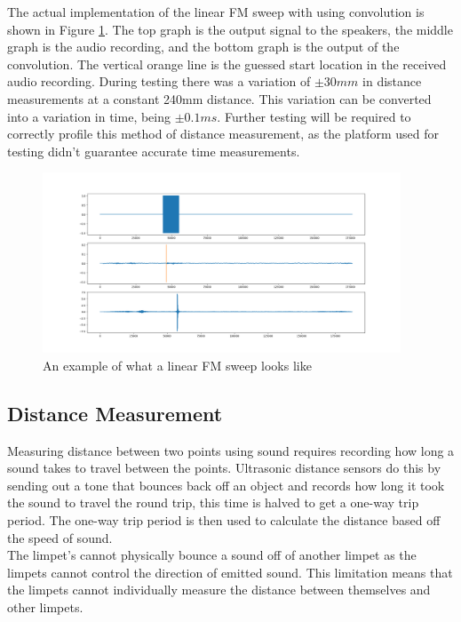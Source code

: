 The actual implementation of the linear FM sweep with using convolution is shown in Figure \ref{fig:matched_filter}. The top graph is the output signal to the speakers, the middle graph is the audio recording, and the bottom graph is the output of the convolution. The vertical orange line is the guessed start location in the received audio recording. During testing there was a variation of $\pm 30mm$ in distance measurements at a constant 240mm distance. This variation can be converted into a variation in time, being $\pm 0.1ms$. Further testing will be required to correctly profile this method of distance measurement, as the platform used for testing didn't guarantee accurate time measurements.

\begin{figure}[H]
	\centering
	\noindent\includegraphics[width=0.95\textwidth]{images/matched_filtering.png}
	\caption{An example of what a linear FM sweep looks like}
	\label{fig:matched_filter}
\end{figure}



\subsection{Distance Measurement}
Measuring distance between two points using sound requires recording how long a sound takes to travel between the points. Ultrasonic distance sensors do this by sending out a tone that bounces back off an object and records how long it took the sound to travel the round trip, this time is halved to get a one-way trip period. The one-way trip period is then used to calculate the distance based off the speed of sound.\\

The limpet's cannot physically bounce a sound off of another limpet as the limpets cannot control the direction of emitted sound. This limitation means that the limpets cannot individually measure the distance between themselves and other limpets.\\


